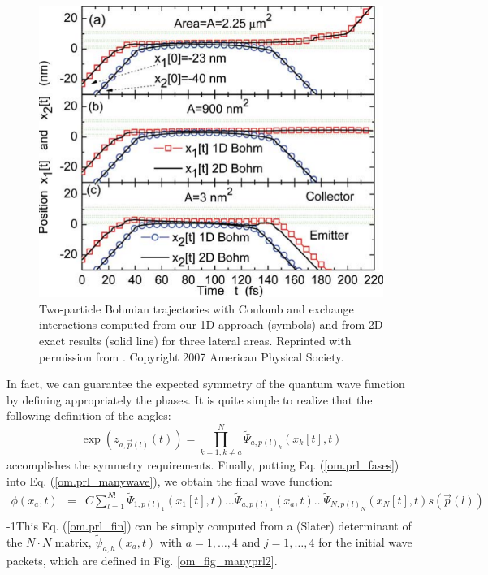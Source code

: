 \documentclass[nofootinbib, secnumarabic, amsmath, nobibnotes,11pt,aps,pra, floatfix]{revtex4-1}
\newcommand{\fref}[1]{Fig. \ref{#1}}
\newcommand{\eref}[1]{Eq. (\ref{#1})}
\begin{document}
\begin{figure}
\centering
\includegraphics{F1_07.pdf}
\caption{Two-particle Bohmian trajectories with Coulomb and exchange interactions computed from our 1D approach (symbols) and from 2D exact results (solid line) for three lateral areas. Reprinted with permission from \cite{om.oriolsprl}. Copyright 2007 American Physical Society.}
\label{om_fig_prl2}
\end{figure}

In fact, we can guarantee the expected symmetry of the quantum wave
function by defining appropriately the phases. It is quite simple
to realize that the following definition of the angles:
\begin{equation}
\label{om.prl_fases}
 \exp { (z_{a,\vec{p}(l)}(t)) } = \prod^{N}_{k = 1,k\neq a} \tilde \Psi_{a,p(l)_k}(x_k[t],t)
\end{equation}
 accomplishes the symmetry requirements. Finally, putting \eref{om.prl_fases} into \eref{om.prl_manywave}, we obtain the final wave function:
\begin{eqnarray}
\phi(x_a,t) &=& C \sum\limits_{l = 1}^{N!}{{{\tilde{\Psi }}}_{1,
p{{(l)}}_1}}({{x}_{1}}[t],t)\ldots {{{\tilde{\Psi }}}_{a, p{{(l)}}_a}}({{x}_{a}},t)\ldots{{{\tilde{\Psi }}}_{N, p{{(l)}}_N}}{({{x}_{N}}[t],t) s(\vec{p}(l))}\nonumber\\
 \label{om.prl_fin}
 \end{eqnarray}
\looseness-1This Eq. (\ref{om.prl_fin}) can be simply computed from a (Slater) determinant of the $N \cdot N$ matrix, $\tilde{\psi}_{a,h}(x_a,t)$ with $a = 1, \ldots , 4$ and $j = 1, \ldots , 4$ for the initial wave packets, which are defined in \fref{om_fig_manyprl2}.
\end{document}
